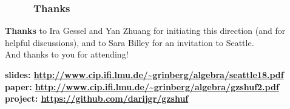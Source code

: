\documentclass{beamer}
\newcommand{\red}{\color{red}}
\newcommand{\fti}[1]{\frametitle{\ \ \ \ \ #1}}
\theoremstyle{plain}
\begin{document}
\begin{frame}
\fti{Thanks}

\textbf{Thanks} to Ira Gessel and Yan Zhuang for initiating this direction
(and for helpful discussions), and to
Sara Billey for an invitation to Seattle. \\
And thanks to you for attending!

\vspace{3cm}

\textbf{slides: \red \url{http://www.cip.ifi.lmu.de/~grinberg/algebra/seattle18.pdf}} \\
\textbf{paper: \red \url{http://www.cip.ifi.lmu.de/~grinberg/algebra/gzshuf2.pdf}} \\
\textbf{project: \red \url{https://github.com/darijgr/gzshuf}}

\end{frame}
\end{document}
